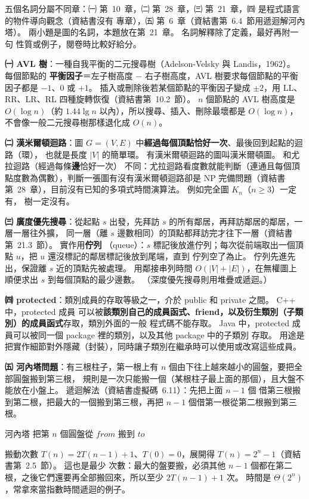 \begin{pastsoln}
五個名詞分屬不同章：㈠ 第~10~章，㈡ 第~28~章，㈢ 第~21~章，㈣ 是程式語言的物件導向觀念（資結書沒有
專章），㈤ 第~6~章（資結書第~6.4~節用遞迴解河內塔）。 兩小題是圖的名詞，本題放在第~21~章。 名詞解釋除了定義，最好再附一句
性質或例子，閱卷時比較好給分。

\textbf{㈠ AVL 樹}：一種自我平衡的二元搜尋樹（Adelson-Velsky 與 Landis，1962）。 每個節點的
\textbf{平衡因子}＝左子樹高度 $-$ 右子樹高度，AVL 樹要求每個節點的平衡因子都是 $-1$、$0$ 或 $+1$。
插入或刪除後若某個節點的平衡因子變成 $\pm 2$，用 LL、RR、LR、RL 四種旋轉恢復（資結書第~10.2~節）。
$n$ 個節點的 AVL 樹高度是 $O(\log n)$（約 $1.44 \lg n$ 以內），所以搜尋、插入、刪除最壞都是
$O(\log n)$，不會像一般二元搜尋樹那樣退化成 $O(n)$。

\textbf{㈡ 漢米爾頓迴路}：圖 $G = (V, E)$ 中\textbf{經過每個頂點恰好一次}、最後回到起點的迴路（環），
也就是長度 $|V|$ 的簡單環。 有漢米爾頓迴路的圖叫漢米爾頓圖。 和尤拉迴路（經過每條\textbf{邊}恰好一次）
不同：尤拉迴路看度數就能判斷（連通且每個頂點度數為偶數），判斷一張圖有沒有漢米爾頓迴路卻是
NP 完備問題（資結書第~28~章），目前沒有已知的多項式時間演算法。 例如完全圖 $K_n$（$n \ge 3$）一定有，
樹一定沒有。

\textbf{㈢ 廣度優先搜尋}：從起點 $s$ 出發，先拜訪 $s$ 的所有鄰居，再拜訪鄰居的鄰居，一層一層往外擴，
同一層（離 $s$ 邊數相同）的頂點都拜訪完才往下一層（資結書第~21.3~節）。 實作用\textbf{佇列}
（queue）：$s$ 標記後放進佇列；每次從前端取出一個頂點 $u$，把 $u$ 還沒標記的鄰居標記後放到尾端，直到
佇列空了為止。 佇列先進先出，保證離 $s$ 近的頂點先被處理。 用鄰接串列時間 $O(|V| + |E|)$，在無權圖上
順便求出 $s$ 到每個頂點的最少邊數。 （深度優先搜尋則用堆疊或遞迴。）

\textbf{㈣ protected}：類別成員的存取等級之一，介於 public 和 private 之間。 C++ 中，protected 成員
可以被\textbf{該類別自己的成員函式、friend，以及衍生類別（子類別）的成員函式}存取，類別外面的一般
程式碼不能存取。 Java 中，protected 成員可以被同一個 package 裡的類別，以及其他 package 中的子類別
存取。 用途是把實作細節對外隱藏（封裝），同時讓子類別在繼承時可以使用或改寫這些成員。

\textbf{㈤ 河內塔問題}：有三根柱子，第一根上有 $n$ 個由下往上越來越小的圓盤，要把全部圓盤搬到第三根，
規則是一次只能搬一個（某根柱子最上面的那個），且大盤不能放在小盤上。 遞迴解法（資結書虛擬碼~6.11）：先把上面 $n - 1$ 個
借第三根搬到第二根，把最大的一個搬到第三根，再把 $n - 1$ 個借第一根從第二根搬到第三根。
\begin{pseudo}[unbreakable]{河內塔}
        \State {}
        \State 把第 $n$ 個圓盤從 $\mathit{from}$ 搬到 $\mathit{to}$
        \State {}
    \EndIf
\EndProcedure
\end{pseudo}
搬動次數 $T(n) = 2T(n - 1) + 1$、$T(0) = 0$，展開得 $T(n) = 2^n - 1$（資結書第~2.5~節）。 這也是最少
次數：最大的盤要搬，必須其他 $n - 1$ 個都在第二根，之後它們還要再全部搬回來，所以至少
$2T(n - 1) + 1$ 次。 時間是 $\Theta(2^n)$，常拿來當指數時間遞迴的例子。
\end{pastsoln}
